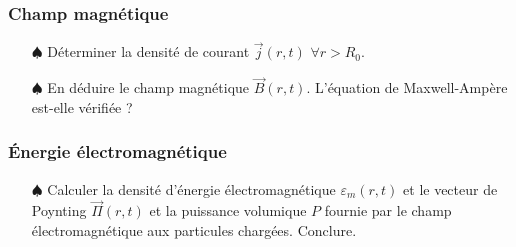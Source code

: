 \documentclass{report}
\begin{document}
\subsubsection*{Champ magnétique}

\begin{itemize}

	\item[$\spadesuit$] Déterminer la densité de courant $\vec{j}(r,t)$ $\forall r>R_0$.
	
	\item[$\spadesuit$] En déduire le champ magnétique $\vec{B}(r,t)$.  L'équation de Maxwell-Ampère est-elle vérifiée ?
	
	\end{itemize}

\subsubsection*{Énergie électromagnétique}

\begin{itemize}

	\item[$\spadesuit$] Calculer la densité d'énergie électromagnétique $\varepsilon_m(r,t)$ et le vecteur de Poynting $\vec{\Pi}(r,t)$ et la puissance volumique $P$ fournie par le champ électromagnétique aux particules chargées. Conclure.
	
\end{itemize}
\end{document}
